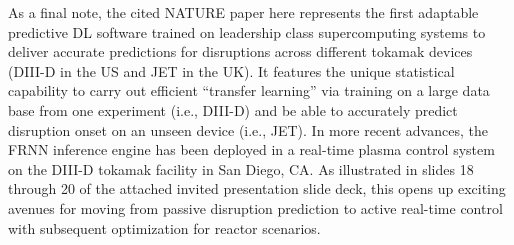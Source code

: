 As a final note, the cited NATURE paper here represents the first adaptable predictive DL software trained on leadership class supercomputing systems to deliver accurate predictions for disruptions across different tokamak devices (DIII-D in the US and JET in the UK).  It features the unique statistical capability to carry out efficient “transfer learning” via training on a large data base from one experiment (i.e., DIII-D) and be able to accurately predict disruption onset on an unseen device (i.e., JET).  In more recent advances, the FRNN inference engine has been deployed in a real-time plasma control system on the DIII-D tokamak facility in San Diego, CA.  As illustrated in slides 18 through 20 of the attached invited presentation slide deck, this opens up exciting avenues for moving from passive disruption prediction to active real-time control with subsequent optimization for reactor scenarios.  



    
    
